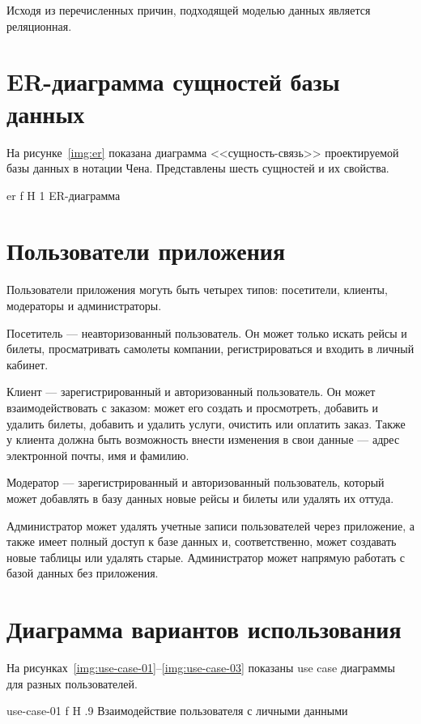 \documentclass{bmstu}
\begin{document}
Исходя из перечисленных причин, подходящей моделью данных является реляционная.

\pagebreak
\section{ER-диаграмма сущностей базы данных}

На рисунке~\ref{img:er} показана диаграмма <<сущность-связь>> проектируемой базы данных в нотации Чена. 
Представлены шесть сущностей и их свойства.

    {er}
    {f}
    {H}
    {1\textwidth}
    {ER-диаграмма}
    
\section{Пользователи приложения}

Пользователи приложения могуть быть четырех типов: посетители, клиенты, модераторы и администраторы.

Посетитель --- неавторизованный пользователь. 
Он может только искать рейсы и билеты, просматривать самолеты компании, регистрироваться и входить в личный кабинет.

Клиент --- зарегистрированный и авторизованный пользователь. 
Он может взаимодействовать с заказом: может его создать и просмотреть, добавить и удалить билеты, добавить и удалить услуги, очистить или оплатить заказ. 
Также у клиента должна быть возможность внести изменения в свои данные --- адрес электронной почты, имя и фамилию. 

Модератор --- зарегистрированный и авторизованный пользователь, который может добавлять в базу данных новые рейсы и билеты или удалять их оттуда.

Администратор может удалять учетные записи пользователей через приложение, а также имеет полный доступ к базе данных и, соответственно, может создавать новые таблицы или удалять старые. 
Администратор может напрямую работать с базой данных без приложения.

\pagebreak
\section{Диаграмма вариантов использования}

На рисунках~\ref{img:use-case-01}--\ref{img:use-case-03} показаны use case диаграммы для разных пользователей.

    {use-case-01}
    {f}
    {H}
    {.9\textwidth}
    {Взаимодействие пользователя с личными данными}
    
\end{document}
